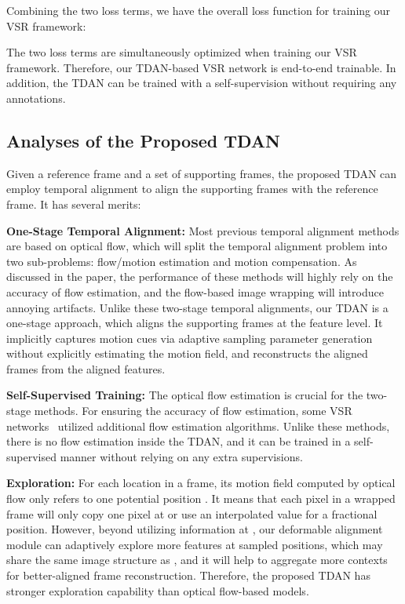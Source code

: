 \documentclass[10pt,twocolumn,letterpaper]{article}
\begin{document}
Combining the two loss terms, we have the overall loss function for training our VSR framework:

The two loss terms are simultaneously optimized when training our VSR framework. Therefore, our TDAN-based VSR network is end-to-end trainable. In addition, the TDAN can be trained with a self-supervision without requiring any annotations.


\subsection{Analyses of the Proposed TDAN}
\label{analysis}

Given a reference frame and a set of supporting frames, the proposed TDAN can employ temporal alignment to align the supporting frames with the reference frame. It has several merits:

\noindent \textbf{One-Stage Temporal Alignment:} Most previous temporal alignment methods are based on optical flow, which will split the temporal alignment problem into two sub-problems: flow/motion estimation and motion compensation. As discussed in the paper, the performance of these methods will highly rely on the accuracy of flow estimation, and the flow-based image wrapping will introduce annoying artifacts. Unlike these two-stage temporal alignments, our TDAN is a one-stage approach, which aligns the supporting frames at the feature level. It implicitly captures motion cues via adaptive sampling parameter generation without explicitly estimating the motion field, and reconstructs the aligned frames from the aligned features.

\noindent \textbf{Self-Supervised Training:} The optical flow estimation is crucial for the two-stage methods. For ensuring the accuracy of flow estimation, some VSR networks~\cite{tao2017detail,xue2017video,liu2017robust} utilized additional flow estimation algorithms. Unlike these methods, there is no flow estimation inside the TDAN, and it can be trained in a self-supervised manner without relying on any extra supervisions.

\noindent \textbf{Exploration:} For each location in a frame, its motion field computed by optical flow only refers to one potential position . It means that each pixel in a wrapped frame will only copy one pixel at  or use an interpolated value for a fractional position. However, beyond utilizing information at , our deformable alignment module can adaptively explore more features at sampled positions, which may share the same image structure as , and it will help to aggregate more contexts for better-aligned frame reconstruction. Therefore, the proposed TDAN has stronger exploration capability than optical flow-based models.
\end{document}
